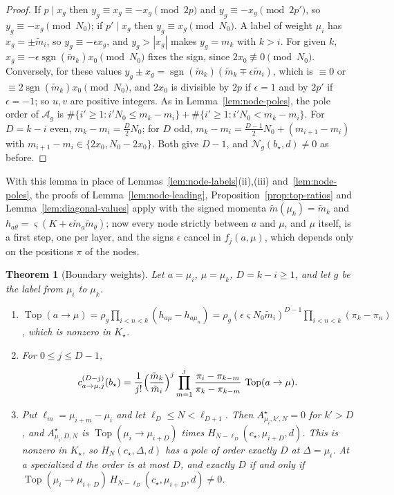 \documentclass[twoside,10pt]{article}
\numberwithin{equation}{section}
\theoremstyle{slbody}
\newtheorem{theorem}{Theorem}[section]
\theoremstyle{definition}
\theoremstyle{remark}
\begin{document}
\begin{proof}
If $p\mid x_g$ then $y_g\equiv x_g\equiv-x_g\pmod{2p}$ and
$y_g\equiv-x_g\pmod{2p'}$, so $y_g\equiv-x_g\pmod{N_0}$; if $p'\mid x_g$ then
$y_g\equiv x_g\pmod{N_0}$.  A label of weight $\mu_i$ has $x_g=\pm \tilde m_i$, so
$y_g\equiv-\epsilon x_g$, and $y_g>|x_g|$ makes $y_g=m_k$ with $k>i$.  For given
$k$, $x_g\equiv-\epsilon\operatorname{sgn}(\tilde m_k)x_0\pmod{N_0}$ fixes the sign,
since $2x_0\not\equiv0\pmod{N_0}$.  Conversely, for these values
$y_g\pm x_g=\operatorname{sgn}(\tilde m_k)(\tilde m_k\mp\epsilon \tilde m_i)$, which is $\equiv0$ or
$\equiv2\operatorname{sgn}(\tilde m_k)x_0\pmod{N_0}$, and $2x_0$ is divisible by $2p$
if $\epsilon=1$ and by $2p'$ if $\epsilon=-1$; so $u,v$ are positive integers.
As in Lemma~\ref{lem:node-poles}, the pole order of ${\mathcal A}_g$ is
$\#\{i'\geq1:i'N_0\leq m_k-m_i\}+\#\{i'\geq1:i'N_0<m_k-m_i\}$.  For
$D=k-i$ even, $m_k-m_i=\frac D2N_0$; for $D$ odd,
$m_k-m_i=\frac{D-1}2N_0+(m_{i+1}-m_i)$ with
$m_{i+1}-m_i\in\{2x_0,N_0-2x_0\}$.  Both give $D-1$, and
${\mathcal N}_g(b_\star,d)\neq0$ as before.
\end{proof}

With this lemma in place of Lemmas~\ref{lem:node-labels}(ii),(iii)
and~\ref{lem:node-poles}, the proofs of Lemma~\ref{lem:node-leading},
Proposition~\ref{prop:top-ratios} and Lemma~\ref{lem:diagonal-values} apply
with the signed momenta $\tilde m(\mu_k)=\tilde m_k$ and $h_{a\theta}=\varsigma(K+\epsilon\tilde m_a\tilde m_\theta)$; now
every node strictly between $a$ and $\mu$, and $\mu$ itself, is a first step,
one per layer, and the signs $\epsilon$ cancel in $f_j(a,\mu)$, which depends
only on the positions $\pi$ of the nodes.

\begin{theorem}[Boundary weights]\label{thm:boundary}
Let $a=\mu_i$, $\mu=\mu_k$, $D=k-i\geq1$, and let $g$ be the label from $\mu_i$
to $\mu_k$.
\begin{enumerate}
\item[(i)] $\operatorname{Top}(a\to\mu)=\rho_g\prod_{i<n<k}(h_{a\mu}-h_{a\mu_n})
=\rho_g(\epsilon\varsigma N_0\tilde m_i)^{D-1}\prod_{i<n<k}(\pi_k-\pi_n)$, which is
nonzero in $K_\star$.
\item[(ii)] For $0\leq j\leq D-1$,
\[
 c^{(D-j)}_{a\to\mu,j}(b_\star)=\frac1{j!}\Bigl(\frac{\tilde m_k}{\tilde m_i}\Bigr)^{j}
 \prod_{m=1}^j\frac{\pi_i-\pi_{k-m}}{\pi_k-\pi_{k-m}}\,\operatorname{Top}(a\to\mu).
\]
\item[(iii)] Put $\ell_m=\mu_{i+m}-\mu_i$ and let $\ell_D\leq N<\ell_{D+1}$.
Then $A^\star_{\mu_i,k',N}=0$ for $k'>D$, and $A^\star_{\mu_i,D,N}$ is
$\operatorname{Top}(\mu_i\to\mu_{i+D})$ times
$H_{N-\ell_D}(c_\star,\mu_{i+D},d)$.  This is nonzero in $K_\star$, so
$H_N(c_\star,\Delta,d)$ has a pole of order exactly $D$ at $\Delta=\mu_i$.  At a
specialized $d$ the order is at most $D$, and exactly $D$ if and only if
$\operatorname{Top}(\mu_i\to\mu_{i+D})\,H_{N-\ell_D}(c_\star,\mu_{i+D},d)\neq0$.
\end{enumerate}
\end{theorem}
\end{document}
